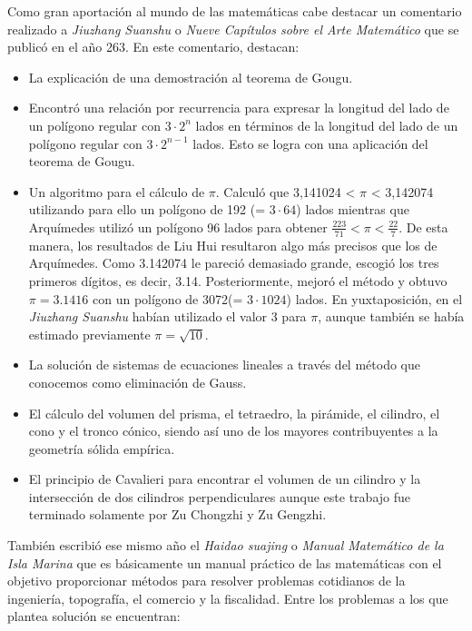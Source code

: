 \documentclass[a4paper, 11pt]{article}
\begin{document}
		Como gran aportación al mundo de las matemáticas cabe destacar un comentario realizado a \textit{Jiuzhang Suanshu}
		o \textit{Nueve Capítulos sobre el Arte Matemático} que se publicó en el año 263. En este comentario, destacan:
		
		\begin{itemize}
			\item La explicación de una demostración al teorema de Gougu.
			\item Encontró una relación por recurrencia para expresar la longitud del lado de un polígono regular con
			$3 \cdot 2^n$ lados en términos de la longitud del lado de un polígono regular con $3 \cdot 2^{n-1}$ lados.
			Esto se logra con una aplicación del teorema de Gougu.
			\item Un algoritmo para el cálculo de $\pi$. Calculó que 3,141024 < $\pi$ < 3,142074 utilizando para ello un
			polígono de 192 (= $3 \cdot 64$) lados mientras que Arquímedes utilizó un polígono 96 lados para obtener
			$\frac {223}{71} < \pi < \frac{22}{7}$. De esta manera, los resultados de Liu Hui resultaron algo más precisos
			que los de Arquímedes. Como 3.142074 le pareció demasiado grande, escogió los tres primeros dígitos, es decir,
			3.14. Posteriormente, mejoró el método y obtuvo $\pi = 3.1416$ con un polígono de 3072(= $3 \cdot 1024$) lados.
			En yuxtaposición, en el \textit{Jiuzhang Suanshu} habían utilizado el valor 3 para $\pi$, aunque también se
			había estimado previamente $\pi = \sqrt{10}$.
			\item La solución de sistemas de ecuaciones lineales a través del método que conocemos como eliminación de Gauss.
			\item El cálculo del volumen del prisma, el tetraedro, la pirámide, el cilindro, el cono y el tronco cónico,
			siendo así uno de los mayores contribuyentes a la geometría sólida empírica.
			\item El principio de Cavalieri para encontrar el volumen de un cilindro y la intersección de dos cilindros
			perpendiculares aunque este trabajo fue terminado solamente por  Zu Chongzhi y Zu Gengzhi.
		\end{itemize}

		También escribió ese mismo año el \textit{Haidao suajing} o \textit{Manual Matemático de la Isla Marina} que es
		básicamente un manual práctico de las matemáticas con el objetivo proporcionar métodos para resolver problemas
		cotidianos de la ingeniería, topografía, el comercio y la fiscalidad. Entre los problemas a los que plantea
		solución se encuentran:
		
\end{document}
